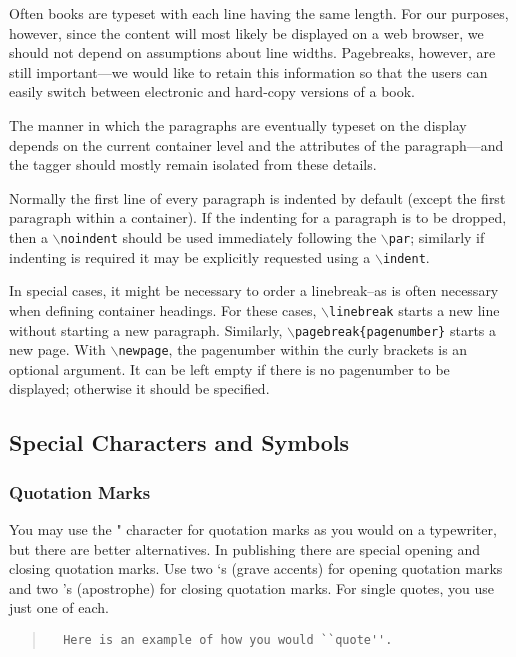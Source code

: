 \documentclass[11pt]{article}
\newcommand{\cmd}[1]{{\tt $\backslash$#1}}
\begin{document}
Often books are typeset with each line having the same length. For our
purposes, however, since the content will most likely be displayed on
a web browser, we should not depend on assumptions about line
widths. Pagebreaks, however, are still important---we would like to
retain this information so that the users can easily switch between
electronic and hard-copy versions of a book.

The manner in which the paragraphs are eventually typeset on the
display depends on the current container level and the attributes of
the paragraph---and the tagger should mostly remain isolated from these
details.

Normally the first line of every paragraph is indented by default
(except the first paragraph within a container). If the indenting for
a paragraph is to be dropped, then a \cmd{noindent} should be used
immediately following the \cmd{par}; similarly if indenting is
required it may be explicitly requested using a \cmd{indent}.

In special cases, it might be necessary to order a linebreak--as is
often necessary when defining container headings. For these cases,
\cmd{linebreak} starts a new line without starting a new
paragraph. Similarly, \cmd{pagebreak\{pagenumber\}} starts a new
page. With \cmd{newpage}, the pagenumber within the curly brackets is
an optional argument. It can be left empty if there is no pagenumber
to be displayed; otherwise it should be specified.

\subsection{Special Characters and Symbols}

\subsubsection{Quotation Marks}

You may use the " character for quotation marks as you would on a
typewriter, but there are better alternatives. In publishing there are
special opening and closing quotation marks. Use two `s (grave
accents) for opening quotation marks and two 's (apostrophe) for
closing quotation marks. For single quotes, you use just one of each.

\begin{quote}
\begin{verbatim}
  Here is an example of how you would ``quote''.
\end{verbatim}
\end{quote}
\end{document}
